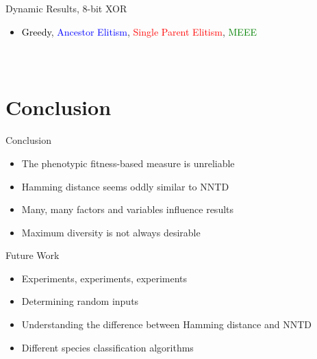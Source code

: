 \begin{frame}[t]{Dynamic Results, 8-bit XOR}
  \begin{itemize}
    \item \textcolor{black}{Greedy}, \textcolor{blue}{Ancestor Elitism}, \textcolor{red}{Single Parent Elitism}, \textcolor{green}{MEEE}
  \end{itemize}

  \begin{columns}[T]
    \begin{figure}
      \centering
      \batchmode
      \scrollmode
    \end{figure}
    \vfill
    \begin{figure}
      \centering
      \batchmode
      \scrollmode
    \end{figure}
    \begin{figure}
      \centering
      \batchmode
      \scrollmode
    \end{figure}
    \begin{figure}
      \centering
      \batchmode
      \scrollmode
    \end{figure}
  \end{columns}

\end{frame}

\section{Conclusion}
\begin{frame}{Conclusion}
  \begin{itemize}
    \item The phenotypic fitness-based measure is unreliable
    \item Hamming distance seems oddly similar to NNTD
    \item Many, many factors and variables influence results
    \item Maximum diversity is not always desirable
  \end{itemize}
\end{frame}

\begin{frame}{Future Work}
  \begin{itemize}
    \item Experiments, experiments, experiments
    \item Determining random inputs %
    \item Understanding the difference between Hamming distance and NNTD
    \item Different species classification algorithms
  \end{itemize}
\end{frame}


